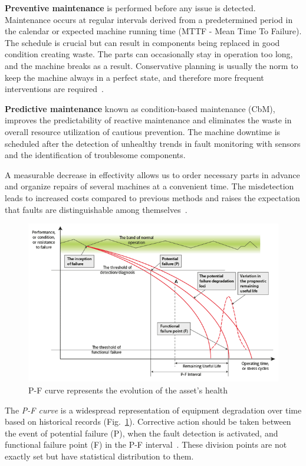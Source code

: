\textbf{Preventive maintenance} is performed before any issue is detected. Maintenance occurs at regular intervals derived from a predetermined period in the calendar or expected machine running time (MTTF - Mean Time To Failure). The schedule is crucial but can result in components being replaced in good condition creating waste. The parts can occasionally stay in operation too long, and the machine breaks as a result. Conservative planning is usually the norm to keep the machine always in a perfect state, and therefore more frequent interventions are required~\cite{mohanty_machinery_2015}.

\textbf{Predictive maintenance} known as condition-based maintenance (CbM), improves the predictability of reactive maintenance and eliminates the waste in overall resource utilization of cautious prevention. The machine downtime is scheduled after the detection of unhealthy trends in fault monitoring with sensors and the identification of troublesome components.

A measurable decrease in effectivity allows us to order necessary parts in advance and organize repairs of several machines at a convenient time. The misdetection leads to increased costs compared to previous methods and raises the expectation that faults are distinguishable among themselves~\cite{davies_handbook_2012}.

\begin{figure}[ht]
	\centering
	\includegraphics[width=\textwidth]{assets/analysis/P-F-Curve.png}
	\caption{P-F curve represents the evolution of the asset's health~\cite{jennions_integrated_2011}}
	\label{fig:p-f-curve}
\end{figure}

The \emph{P-F curve} is a widespread representation of equipment degradation over time based on historical records (Fig.~\ref{fig:p-f-curve}). Corrective action should be taken between the event of potential failure (P), when the fault detection is activated, and functional failure point (F) in the P-F interval~\cite{bousdekis_enterprise_2021}.  These division points are not exactly set but have statistical distribution to them.


